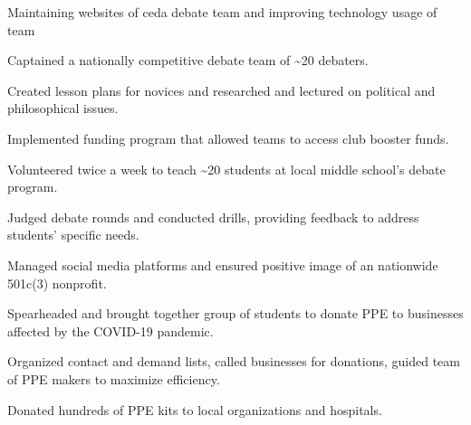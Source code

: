 \documentclass[letterpaper]{resume-shreeram}
\begin{document}
\begin{compactitem}
  \item
    Maintaining websites of ceda debate team and improving technology usage of team
\end{compactitem}

\begin{compactitem}
  \item
    Captained a nationally competitive debate team of \textasciitilde{}20 debaters.

  \item
    Created lesson plans for novices and researched and lectured on political and philosophical issues.

  \item
    Implemented funding program that allowed teams to access club booster funds.
\end{compactitem}

\begin{compactitem}
  \item
    Volunteered twice a week to teach \textasciitilde{}20 students at local middle school's debate program.

  \item
    Judged debate rounds and conducted drills, providing feedback to address students' specific needs.
\end{compactitem}

\begin{compactitem}
  \item
    Managed social media platforms and ensured positive image of an nationwide 501c(3) nonprofit.
\end{compactitem}

\begin{compactitem}
  \item
    Spearheaded and brought together group of students to donate PPE to businesses affected by the COVID-19 pandemic.

  \item
    Organized contact and demand lists, called businesses for donations, guided team of PPE makers to maximize efficiency.

  \item
    Donated hundreds of PPE kits to local organizations and hospitals.
\end{compactitem}
\end{document}
